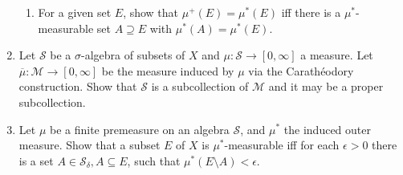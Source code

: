 \begin{enumerate}
\begin{enumerate}[label=(\roman*),align=left]
		\item For a given set $E$, show that $\mu^+(E)=\mu^*(E)$ iff there is a $\mu^*$-measurable set $A\supseteq E$ with $\mu^*(A)=\mu^*(E)$.
	\end{enumerate}
	\item Let $\mathcal{S}$ be a $\sigma$-algebra of subsets of $X$ and $\mu:\mathcal{S}\to[0,\infty]$ a measure.
	Let $\overline\mu:\mathcal{M}\to[0,\infty]$ be the measure induced by $\mu$ via the Carath\'eodory construction.
	Show that $\mathcal{S}$ is a subcollection of $\mathcal{M}$ and it may be a proper subcollection.
	\item Let $\mu$ be a finite premeasure on an algebra $\mathcal{S}$, and $\mu^*$ the induced outer measure.
	Show that a subset $E$ of $X$ is $\mu^*$-measurable iff for each $\epsilon>0$ there is a set $A\in\mathcal{S}_\delta,A\subseteq E$, such that $\mu^*(E\setminus A)<\epsilon$.
\end{enumerate}
